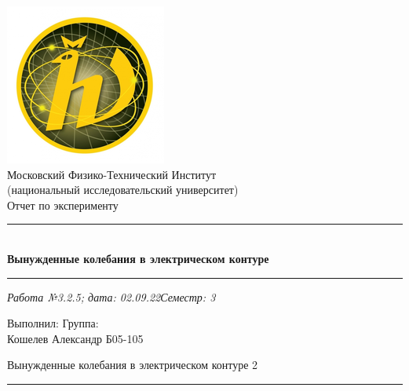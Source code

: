 \documentclass[12pt,a4paper]{scrartcl}
\begin{document}
	\begin{titlepage}
		
		\vspace*{\fill}
		
		\begin{center}
			\includegraphics[scale=0.8]{MIPT.png}
			\\[0.7cm]\Huge Московский Физико-Технический Институт\\(национальный исследовательский университет)
			\\[2cm]\LARGE Отчет по эксперименту
			\\[0.5cm]\noindent\rule{\textwidth}{1pt}
			\\\Huge\textbf{Вынужденные колебания в электрическом контуре}
			\\[-0.5cm]\noindent\rule{\textwidth}{1pt}
		\end{center}
		
		\begin{flushleft}
			\textit{Работа №3.2.5; дата: 02.09.22}\hfill\textit{Семестр: 3}
		\end{flushleft}
		
		\vspace*{\fill}
		
		\begin{flushleft}
			Выполнил: \hspace{\fill} Группа:
			\\Кошелев Александр \hspace{\fill} Б05-105
		\end{flushleft}
	\end{titlepage}
	
	
	\begin{flushleft}
		\footnotesize{Вынужденные колебания в электрическом контуре} \hspace{\fill} \footnotesize{2}
		\\[-0.3cm]\noindent\rule{\textwidth}{0.3pt}
	\end{flushleft}
	
\end{document}
